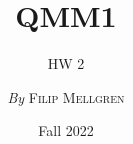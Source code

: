 

\title{QMM1}
\subtitle{HW 2}
\author{\textit{By} \textsc{Filip Mellgren}}
\date{Fall 2022}


	
	\maketitle
	
	
	
	

